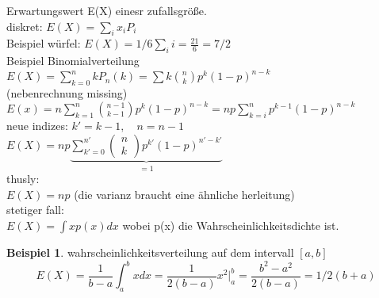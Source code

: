 \documentclass[a4paper]{article}
\theoremstyle{definition}
\newtheorem{beispiel}{Beispiel}
\theoremstyle{remark}
\begin{document}
  Erwartungswert E(X) einesr zufallsgröße. \\
  diskret: $E(X)=\sum_i x_iP_i$\\
  Beispiel würfel: $E(X)= 1/6\sum_i i=\frac{21}{6}=7/2$\\
  Beispiel Binomialverteilung $E(X)=  \sum_{k=0}^{n}kP_n(k)=\sum k \binom{n}{k}p^k(1-p)^{n-k}$\\
(nebenrechnung missing)\\
  $E(x)=n\sum_{k=1}^n \binom {n-1}{k-1}p^k(1-p)^{n-k}=np\sum_{k=i}^n p^{k-1}(1-p)^{n-k}$\\
  neue indizes: $k'=k-1,\quad n=n-1$\\
  $E(X)= np   
  \underbrace{\sum_{k'=0}^{n'} \begin{pmatrix}
  n\\k
  \end{pmatrix}p^{k'}(1-p)^{n'-k'}}_{=1}$\\
  thusly:\\
  $E(X)=np$
  (die varianz braucht eine ähnliche herleitung)\\
  stetiger fall:\\
  $E(X)= \int xp(x)dx$ wobei p(x) die Wahrscheinlichkeitsdichte ist.
\begin{beispiel}
  
   wahrscheinlichkeitsverteilung auf dem intervall $[a,b]$ \\
  \begin{equation}
  E(X)= \frac{1}{b-a}\int_a^b xdx= \frac{1}{2(b-a)}x^2|_a^b=\frac{b^2-a^2}{2(b-a)}=1/2 (b+a)
  \end{equation}
\end{beispiel}
\end{document}
